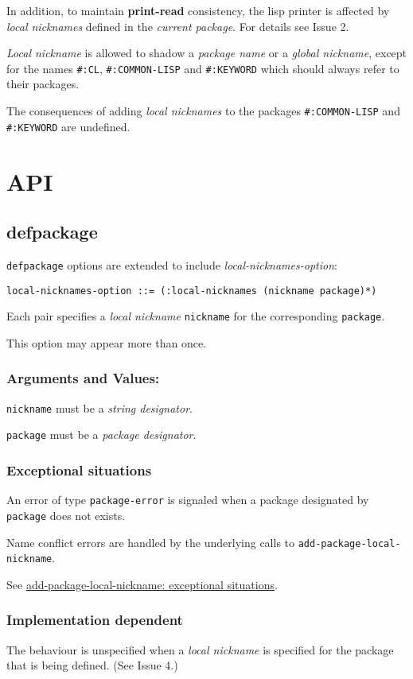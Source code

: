 \documentclass[11pt]{article}
\begin{document}
In addition, to maintain \textbf{print-read} consistency, the lisp printer is affected by
\emph{local nicknames} defined in the \emph{current package}.
For details see Issue 2.

\emph{Local nickname} is allowed to shadow a \emph{package name} or a \emph{global nickname},
except for the names \texttt{\#:CL}, \texttt{\#:COMMON-LISP} and \texttt{\#:KEYWORD} which should always
refer to their packages.

The consequences of adding \emph{local nicknames} to the packages \texttt{\#:COMMON-LISP} and
\texttt{\#:KEYWORD} are undefined.
\section{API}
\label{sec:org5cc6535}
\subsection{defpackage}
\label{sec:orgc0587b2}
\texttt{defpackage} options are extended to include \emph{local-nicknames-option}:
\begin{verbatim}
local-nicknames-option ::= (:local-nicknames (nickname package)*)
\end{verbatim}


Each pair specifies a \emph{local nickname} \texttt{nickname} for the corresponding \texttt{package}.

This option may appear more than once.
\subsubsection{Arguments and Values:}
\label{sec:orge0d1b51}
\texttt{nickname} must be a \emph{string designator}.

\texttt{package} must be a \emph{package designator}.
\subsubsection{Exceptional situations}
\label{sec:orgb79fe55}
An error of type \texttt{package-error} is signaled when a package designated by
\texttt{package} does not exists.

Name conflict errors are handled by the underlying calls to
\texttt{add-package-local-nickname}.

See \hyperref[sec:org22e3196]{add-package-local-nickname: exceptional situations}.
\subsubsection{Implementation dependent}
\label{sec:org983149f}
The behaviour is unspecified when a \emph{local nickname} is specified for the package
that is being defined. (See Issue 4.)
\end{document}
